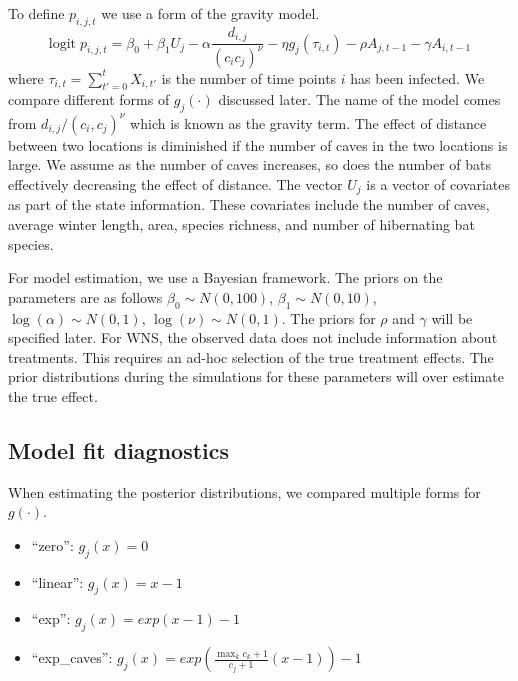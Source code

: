 \documentclass[11pt]{article}
\newcommand{\logit}{\text{logit}}
\begin{document}
To define $p_{i,j,t}$ we use a form of the gravity model.
\begin{equation*}
  \logit \; p_{i,j,t} = \beta_0 + \beta_1 U_j 
  - \alpha \frac{d_{i,j}}{(c_ic_j)^\nu} - \eta g_j(\tau_{i,t})
  - \rho A_{j,t-1} - \gamma A_{i,t-1}
\end{equation*}
where $\tau_{i,t} = \sum_{t' = 0}^t X_{i,t'}$ is the number of time
points $i$ has been infected.  We compare different forms of
$g_j(\cdot)$ discussed later.  The name of the model comes from
$d_{i,j}/(c_i,c_j)^\nu$ which is known as the gravity term.  The
effect of distance between two locations is diminished if the number
of caves in the two locations is large.  We assume as the number of
caves increases, so does the number of bats effectively decreasing the
effect of distance.  The vector $U_j$ is a vector of covariates as
part of the state information.  These covariates include the number of
caves, average winter length, area, species richness, and number of
hibernating bat species.

For model estimation, we use a Bayesian framework.  The priors on the
parameters are as follows $\beta_0 \sim N(0,100)$, $\beta_1 \sim
N(0,10)$, $\log(\alpha) \sim N(0,1)$, $\log(\nu) \sim N(0,1)$.  The
priors for $\rho$ and $\gamma$ will be specified later.  For WNS, the
observed data does not include information about treatments.  This
requires an ad-hoc selection of the true treatment effects.  The prior
distributions during the simulations for these parameters will over
estimate the true effect.

\subsection{Model fit diagnostics}
\label{sec-2-2}

When estimating the posterior distributions, we compared multiple
forms for $g(\cdot)$.
\begin{itemize}
  \item ``zero'': $g_j(x) = 0$
  \item ``linear'': $g_j(x) = x - 1$
  \item ``exp'': $g_j(x) = exp(x - 1) - 1$
  \item ``exp\_caves'': $g_j(x) = exp(\frac{\max_k c_k+1}{c_j + 1}(x - 1)) - 1$
\end{itemize}
\end{document}
